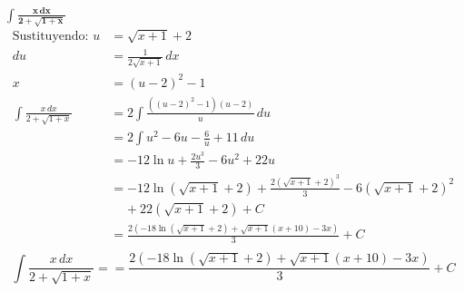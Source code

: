 $\displaystyle \mathbf{ \int 
        \frac{x\,dx}{2 + \sqrt{1 + x}}
    }$ 
\nopagebreak
\begin{align*}
\text{Sustituyendo: } u &= \sqrt{x + 1} + 2\\[6pt]
du &= \frac{1}{2 \sqrt{x + 1}}\, dx\\[6pt]
x &= \left(u - 2\right)^{2} - 1\\[6pt]
\int \frac{x\,dx}{2 + \sqrt{1 + x}}
&= 2 \int \frac{\left(\left(u - 2\right)^{2} - 1\right) \left(u - 2\right)}{u} \, du\\[6pt]
&= 2\int u^{2} - 6u - \frac{6}{u} + 11\, du \\[6pt]
&= -12 \ln u + \frac{2u^{3}}{3} - 6u^{2} + 22u\\[6pt]
&= -12 \ln\left(\sqrt{x + 1} + 2\right) + \frac{2 \left(\sqrt{x + 1} + 2\right)^{3}}{3} - 6 \left(\sqrt{x + 1} + 2\right)^{2}\\[6pt]
&\;\;\;\; + 22 \left(\sqrt{x + 1} + 2\right) + C\\[6pt]
&= \frac{2 \left(-18 \ln\left(\sqrt{x + 1} + 2\right) + \sqrt{x + 1} \left(x + 10\right) - 3x\right)}{3} + C\\[6pt]
\end{align*}
\[
\boxed{\displaystyle \int
    \frac{x\,dx}{2 + \sqrt{1 + x}} 
    = = \frac{2 \left(-18 \ln\left(\sqrt{x + 1} + 2\right) + \sqrt{x + 1} \left(x + 10\right) - 3x\right)}{3} + C
}
\]  